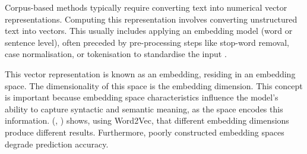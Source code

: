 \documentclass[10pt,oneside]{report}
\renewcommand{\citet}[1]{\citeauthor{#1}, \citeyear{#1}}
\begin{document}

Corpus-based methods typically require converting text into numerical vector representations. Computing this representation involves converting unstructured text into vectors. This usually includes applying an embedding model (word or sentence level), often preceded by pre-processing steps like stop-word removal, case normalisation, or tokenisation to standardise the input \cite{tabassum2020survey}. %



This vector representation is known as an embedding, residing in an embedding space. The dimensionality of this space is the embedding dimension. This concept is important because embedding space characteristics influence the model's ability to capture syntactic and semantic meaning, as the space encodes this information. (\citet{bojanowski2017enriching}) shows, using Word2Vec, that different embedding dimensions produce different results. Furthermore, poorly constructed embedding spaces degrade prediction accuracy.
\end{document}
